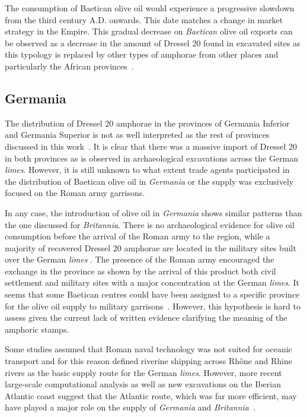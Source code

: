 The consumption of Baetican olive oil would experience a progressive slowdown from the third century A.D. onwards. This date matches a change in market strategy in the Empire. This gradual decrease on \textit{Baetican} olive oil exports can be observed as a decrease in the amount of Dressel 20 found in excavated sites as this typology is replaced by other types of amphorae from other places and particularly the African provinces~\citep{rodriguez1991aceite,millet_anforas_1998}.

\subsection{Germania}
\label{sec:4}

The distribution of Dressel 20 amphorae in the provinces of Germania Inferior and Germania Superior is not as well interpreted as the rest of provinces discussed in this work~\citep[293]{remesal_baetica_2002}. It is clear that there was a massive import of Dressel 20 in both provinces as is observed in archaeological excavations across the German \textit{limes}. However, it is still unknown to what extent trade agents participated in the distribution of Baetican olive oil in \textit{Germania} or the supply was exclusively focused on the Roman army garrisons\citep[156]{remesal_germn_2010}.

In any case, the introduction of olive oil in \textit{Germania} shows similar patterns than the one discussed for \textit{Britannia}. There is no archaeological evidence for olive oil consumption before the arrival of the Roman army to the region, while a majority of recovered Dressel 20 amphorae are located in the military sites built over the German \textit{limes} \citep{remesal_germaniaengl_2002}. The presence of the Roman army encouraged the exchange in the province as shown by the arrival of this product both civil settlement and military sites with a major concentration at the German \textit{limes}. It seems that some Baetican centres could have been assigned to a specific province for the olive oil supply to military garrisons~\citep[125]{remesal_concierto}. However, this hypothesis is hard to assess given the current lack of written evidence clarifying the meaning of the amphoric stamps. 

Some studies assumed that Roman naval technology was not suited for oceanic transport and for this reason defined riverine shipping across Rhône and Rhine rivers as the basic supply route for the German \textit{limes}. However, more recent large-scale computational analysis as well as new excavations on the Iberian Atlantic coast suggest that the Atlantic route, which was far more efficient, may have played a major role on the supply of \textit{Germania} and \textit{Britannia}~\citep{rubio-campillo_ecology_2018}.


